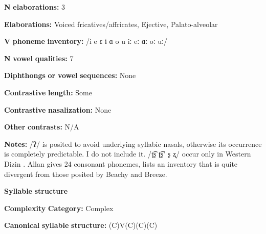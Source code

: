 \documentclass[output=paper]{langsci/langscibook}
\begin{document}
\begin{styleBody}
\textbf{N} \textbf{elaborations:} 3
\end{styleBody}

\begin{styleBody}
\textbf{Elaborations:} Voiced fricatives/affricates, Ejective, Palato-alveolar
\end{styleBody}

\begin{styleBody}
\textbf{V} \textbf{phoneme} \textbf{inventory:} /i e ɛ ɨ ɑ o u iː eː ɑː oː uː/
\end{styleBody}

\begin{styleBody}
\textbf{N} \textbf{vowel} \textbf{qualities:} 7
\end{styleBody}

\begin{styleBody}
\textbf{Diphthongs} \textbf{or} \textbf{vowel} \textbf{sequences:} None
\end{styleBody}

\begin{styleBody}
\textbf{Contrastive} \textbf{length:} Some
\end{styleBody}

\begin{styleBody}
\textbf{Contrastive} \textbf{nasalization:} None
\end{styleBody}

\begin{styleBody}
\textbf{Other} \textbf{contrasts:} N/A
\end{styleBody}

\begin{styleBody}
\textbf{Notes:} /ʔ/ is posited to avoid underlying syllabic nasals, otherwise its occurrence is completely predictable. I do not include it. /ʈ͡ʂ ʈ͡ʂ’ ʂ ʐ/ occur only in Western Dizin \citep{Beach2005}. Allan gives 24 consonant phonemes, lists an inventory that is quite divergent from those posited by Beachy and Breeze.
\end{styleBody}

\begin{styleBody}
\textbf{Syllable} \textbf{structure}
\end{styleBody}

\begin{styleBody}
\textbf{Complexity} \textbf{Category:} Complex
\end{styleBody}

\begin{styleBody}
\textbf{Canonical} \textbf{syllable} \textbf{structure:} (C)V(C)(C)(C) \citep[38-46]{Beachy2005}
\end{styleBody}
\end{document}

